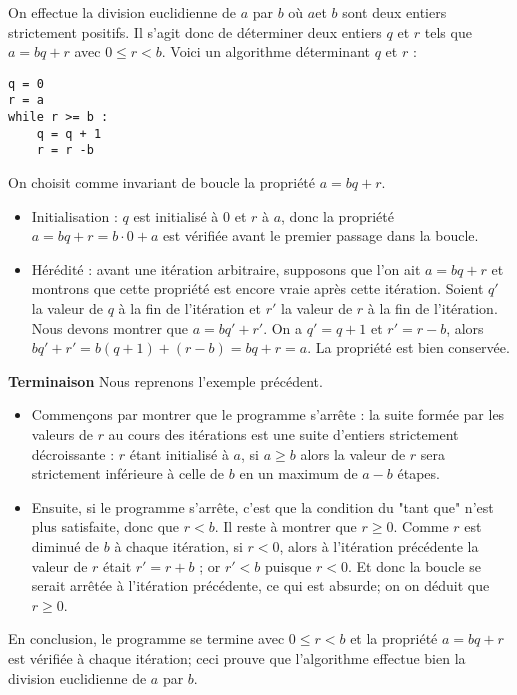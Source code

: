 On effectue la division euclidienne de $a$ par $b$ où $a $et $b$ sont deux entiers strictement positifs. Il s’agit
donc de déterminer deux entiers $q$ et $r$ tels que $a = bq+r$ avec $0 \leq r < b$. Voici un algorithme déterminant
$q$ et $r$ :

\begin{lstlisting}
q = 0
r = a
while r >= b :
    q = q + 1
    r = r -b
\end{lstlisting}

On choisit comme invariant de boucle la propriété $a = bq + r$.
\begin{itemize}
\item Initialisation : $q$ est initialisé à 0 et $r$ à $a$, donc la propriété $a = bq + r = b\cdot 0 + a$ est vérifiée avant le premier passage dans la boucle.
\item Hérédité : avant une itération arbitraire, supposons que l’on ait $a = bq + r$ et montrons que cette propriété est encore vraie après cette itération. Soient $q'$ la valeur de $q$ à la fin de l’itération et $r'$ la valeur de $r$ à la fin de l’itération. Nous devons montrer que $a = bq' + r'$. On a $q'= q + 1$ et $r' = r- b$, alors $bq' + r' = b(q + 1) + (r - b) = bq + r = a$. La propriété est bien conservée.
\end{itemize}


\textbf{Terminaison}
Nous reprenons l’exemple précédent.
\begin{itemize}
\item Commençons par montrer que le programme s’arrête : la suite formée par les valeurs de $r$ au cours
des itérations est une suite d’entiers strictement décroissante : $r$ étant initialisé à $a$, si $a \geq b$ alors
la valeur de $r$ sera strictement inférieure à celle de $b$ en un maximum de $a - b$ étapes.
\item Ensuite, si le programme s’arrête, c’est que la condition du "tant que" n’est plus satisfaite, donc
que $r < b$. Il reste à montrer que $r \geq 0$. Comme $r$ est diminué de $b$ à chaque itération, si $r < 0$,
alors à l’itération précédente la valeur de $r$ était $r' = r + b$ ; or $r' < b$ puisque $r < 0$. Et donc la
boucle se serait arrêtée à l’itération précédente, ce qui est absurde; on on déduit que $r \geq 0$.
\end{itemize}
En conclusion, le programme se termine avec $0 \leq r < b$ et la propriété $a = bq + r$ est vérifiée à chaque
itération; ceci prouve que l’algorithme effectue bien la division euclidienne de $a$ par $b$.



